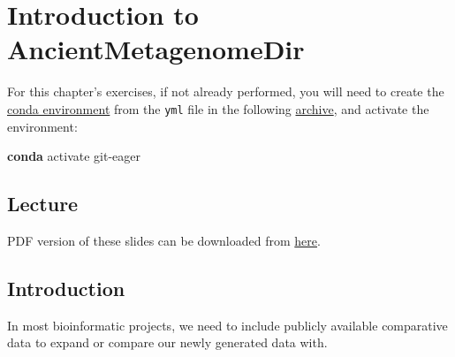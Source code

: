 \documentclass[
  letterpaper,
]{book}
\newenvironment{Shaded}{}{}
\newcommand{\ExtensionTok}[1]{\textcolor[rgb]{0.84,0.23,0.29}{\textbf{#1}}}
\newcommand{\NormalTok}[1]{\textcolor[rgb]{0.14,0.16,0.18}{#1}}
\begin{document}
\hypertarget{introduction-to-ancientmetagenomedir}{%
\chapter{Introduction to
AncientMetagenomeDir}\label{introduction-to-ancientmetagenomedir}}

\begin{tcolorbox}[enhanced jigsaw, opacitybacktitle=0.6, bottomtitle=1mm, opacityback=0, colback=white, coltitle=black, leftrule=.75mm, toprule=.15mm, title=\textcolor{quarto-callout-tip-color}{\faLightbulb}\hspace{0.5em}{Tip}, colframe=quarto-callout-tip-color-frame, toptitle=1mm, arc=.35mm, left=2mm, titlerule=0mm, breakable, rightrule=.15mm, bottomrule=.15mm, colbacktitle=quarto-callout-tip-color!10!white]

For this chapter's exercises, if not already performed, you will need to
create the \protect\hyperlink{creating-a-conda-environment}{conda
environment} from the \texttt{yml} file in the following
\href{https://doi.org/10.5281/zenodo.6983130}{archive}, and activate the
environment:

\begin{Shaded}
\begin{Highlighting}[]
\ExtensionTok{conda}\NormalTok{ activate git{-}eager}
\end{Highlighting}
\end{Shaded}

\end{tcolorbox}

\hypertarget{lecture-14}{%
\section{Lecture}\label{lecture-14}}

PDF version of these slides can be downloaded from
\href{https://github.com/SPAAM-community/https://github.com/SPAAM-community/wss-summer-school/raw/main/docs/raw/main/docs/assets/slides/2022/2c-intro-to-ancientmetagenomedir/SPAAM\%20Summer\%20School\%202022\%20-\%202C\%20-\%20AncientMetagenomeDir.pdf}{here}.

\hypertarget{introduction-4}{%
\section{Introduction}\label{introduction-4}}

In most bioinformatic projects, we need to include publicly available
comparative data to expand or compare our newly generated data with.
\end{document}
